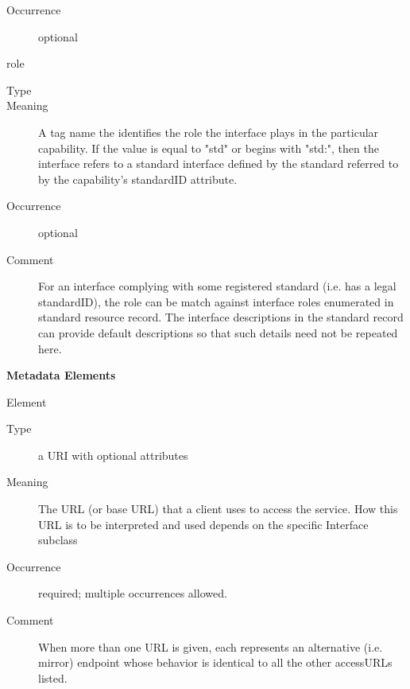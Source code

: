 \documentclass[11pt,a4paper]{ivoa}
\begin{document}
\begin{generated}
\begin{bigdescription}
\begin{description}
\item[Occurrence] optional
\end{description}
\item[role]
\begin{description}
\item[Type] 
\item[Meaning] 
               A tag name the identifies the role the interface plays
               in the particular capability.  If the value is equal to
               {"}std{"} or begins with {"}std:{"}, then the interface refers
               to a standard interface defined by the standard
               referred to by the capability's standardID attribute.  
            
\item[Occurrence] optional
\item[Comment] 
               For an interface complying with some registered
               standard (i.e. has a legal standardID), the role can be
               match against interface roles enumerated in standard 
               resource record.  The interface descriptions in
               the standard record can provide default descriptions 
               so that such details need not be repeated here.  
            
\end{description}


\end{bigdescription}\endgroup



\vspace{0.5ex}\noindent\textbf{ Metadata Elements}

\begingroup\small\begin{bigdescription}\item[Element \xmlel{accessURL}]
\begin{description}
\item[Type] a URI with optional attributes
\item[Meaning] 
                 The URL (or base URL) that a client uses to access the
                 service.  How this URL is to be interpreted and used 
                 depends on the specific Interface subclass
               
\item[Occurrence] required; multiple occurrences allowed.
\item[Comment] 
                 When more than one URL is given, each represents an
                 alternative (i.e. mirror) endpoint whose behavior is
                 identical to all the other accessURLs listed.  
               


\end{description}
\end{bigdescription}
\end{generated}
\end{document}
